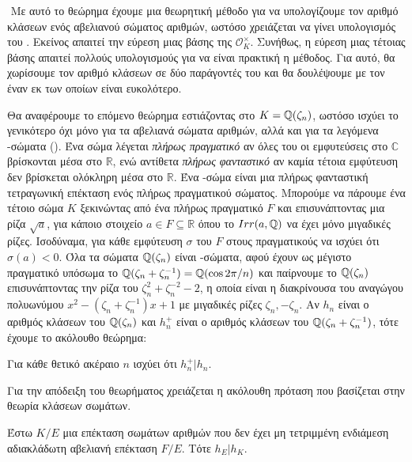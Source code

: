 $ $\newline
Με αυτό το θεώρημα έχουμε μια θεωρητική μέθοδο για να υπολογίζουμε τον αριθμό κλάσεων ενός αβελιανού σώματος αριθμών, ωστόσο χρειάζεται να γίνει υπολογισμός 
του . Εκείνος απαιτεί την εύρεση μιας βάσης της $\mathcal{O}_K^\times$. Συνήθως, η εύρεση μιας τέτοιας βάσης απαιτεί πολλούς υπολογισμούς 
για να είναι πρακτική η μέθοδος. Για αυτό, θα χωρίσουμε τον αριθμό κλάσεων σε δύο παράγοντές του και θα δουλέψουμε με τον έναν εκ των οποίων είναι ευκολότερο. 

Θα αναφέρουμε το επόμενο θεώρημα εστιάζοντας στο $K = \mathbb{Q}(\zeta_n)$, ωστόσο ισχύει το γενικότερο όχι μόνο για τα 
αβελιανά σώματα αριθμών, αλλά και για τα λεγόμενα -σώματα (). Ένα σώμα λέγεται {\em πλήρως πραγματικό} αν όλες του 
οι εμφυτεύσεις στο $\mathbb{C}$ βρίσκονται μέσα στο $\mathbb{R}$, ενώ αντίθετα {\em πλήρως φανταστικό} αν καμία τέτοια εμφύτευση δεν βρίσκεται 
ολόκληρη μέσα στο $\mathbb{R}$. Ένα -σώμα είναι μια πλήρως φανταστική τετραγωνική επέκταση ενός πλήρως πραγματικού σώματος. 
Μπορούμε να πάρουμε ένα τέτοιο σώμα $K$ ξεκινώντας από ένα πλήρως πραγματικό $F$ και επισυνάπτοντας μια ρίζα $\sqrt{a}$, για κάποιο στοιχείο 
$a \in F \subseteq \mathbb{R}$ όπου το $Irr(a,\mathbb{Q})$ να έχει μόνο μιγαδικές ρίζες. Ισοδύναμα, για κάθε εμφύτευση $\sigma$ του $F$ στους πραγματικούς 
να ισχύει ότι $\sigma(a)<0$. Όλα τα σώματα $\mathbb{Q}(\zeta_n)$ είναι -σώματα, αφού έχουν ως μέγιστο πραγματικό υπόσωμα το $\mathbb{Q}(\zeta_n+\zeta_n^{-1}) 
= \mathbb{Q}(\cos 2\pi /n)$ και παίρνουμε το $\mathbb{Q}(\zeta_n)$ επισυνάπτοντας την ρίζα του $\zeta_n^2 + \zeta_n^{-2} - 2$, η οποία είναι η διακρίνουσα 
του αναγώγου πολυωνύμου $x^2 -(\zeta_n + \zeta_n^{-1})x + 1$ με μιγαδικές ρίζες $\zeta_n,-\zeta_n$. Αν $h_n$ είναι ο αριθμός κλάσεων του $\mathbb{Q}(\zeta_n)$ 
και $h^+_n$ είναι ο αριθμός κλάσεων του $\mathbb{Q}(\zeta_n+\zeta_n^{-1})$, τότε έχουμε το ακόλουθο θεώρημα:

\begin{theorem}
	Για κάθε θετικό ακέραιο $n$ ισχύει ότι $h_n^+ | h_n$.
\end{theorem}

\noindent Για την απόδειξη του θεωρήματος χρειάζεται η ακόλουθη πρόταση που βασίζεται στην θεωρία κλάσεων σωμάτων.

\begin{prop}
	Έστω $K/E$ μια επέκταση σωμάτων αριθμών που δεν έχει μη τετριμμένη ενδιάμεση αδιακλάδωτη αβελιανή επέκταση $F/E$. Τότε $h_E|h_K$.
\end{prop}

